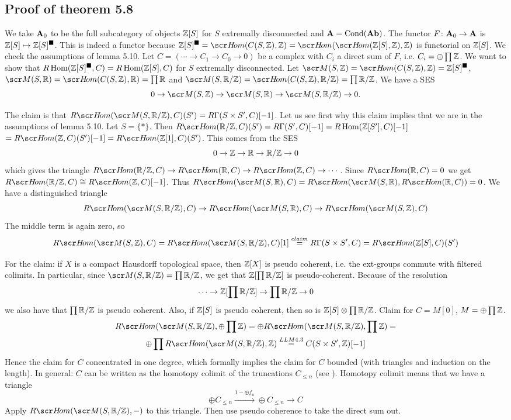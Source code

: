\documentclass[A4paper, british]{amsart}
\theoremstyle{darkgreentheorem}
\theoremstyle{darkbluedefinition}
\theoremstyle{darkredexample}
\theoremstyle{remark}
\DeclareMathOperator{\Hom}{Hom}
\DeclareMathOperator{\Cond}{Cond}
\newcommand{\1}{\mathbbm{1}}
\newcommand{\ot}{\otimes}
\newcommand{\op}{\oplus}
\newcommand{\tms}{\times}
\newcommand{\solid}{^{\blacksquare}}
\begin{document}
\subsection{Proof of theorem 5.8}

We take $\mathbf{A}_{0}$ to be the full subcategory of objects $\mathbb{Z}[S]$ for $S$ extremally disconnected and $\bfA=\Cond(\Ab)$.
The functor $F\colon \mathbf{A}_{0}\to \mathbf{A}$ is $\Z[S]\mapsto \Z[S]\solid$.
This is indeed a functor because $\Z[S]\solid=\hom(C(S,\Z),\Z)=\hom(\hom(\Z[S],\Z),\Z)$ is functorial on $\mathbb{Z}[S]$.
We check the assumptions of lemma 5.10.
Let $C=(\cdots \to C_{1}\to C_{0}\to 0)$ be a complex with $C_{i}$ a direct sum of $F$, i.e. $C_{i}=\op \prod \Z$.
We want to show that $R\Hom(\Z[S]\solid,C)=R\Hom(\Z[S],C)$ for $S$ extremally disconnected.
Let $\M(S,\Z)=\hom(C(S,\Z),\Z)=\Z[S]\solid$, $\M(S,\R)=\hom(C(S,\Z),\R)=\prod \R$ and $\M(S,\R/\Z)=\hom(C(S,\Z),\R/\Z)=\prod \R/\Z$.
We have a SES
\[ 0\to \M(S,\Z)\to \M(S,\R)\to \M(S,\R/\Z)\to 0.\]

The claim is that $R\hom(\M(S,\R/\Z),C)(S')=R\Gamma (S\tms S',C)[-1]$.
Let us see first why this claim implies that we are in the assumptions of lemma 5.10.
Let $S=\{*\}$.
Then $R\hom(\R/\Z,C)(S')=R\Gamma(S',C)[-1]=R\Hom(\Z[S'],C)[-1]$$=R\hom(\Z,C)(S')[-1]=R\hom(\Z[1],C)(S')$.
This comes from the SES
\[ 0\to \mathbb{Z}\to \mathbb{R}\to \mathbb{R}/\mathbb{Z}\to 0 \]
which gives the triangle $R\hom(\R/\Z,C)\to R\hom(\R,C)\to R\hom(\Z,C)\to \cdots$.
Since $R\hom(\R,C)=0$ we get $R\hom(\R/\Z,C)\cong R\hom(\Z,C)[-1]$.
Thus $R\hom(\M(S,\R),C)=R\hom(\M(S,\R),R\hom(\R,C))=0$.
We have a distinguished triangle
\[ R\hom(\M(S,\R/\Z),C)\to R\hom(\M(S,\R),C)\to R\hom(\M(S,\Z),C) \]
The middle term is again zero, so
\[ R\hom(\M(S,\Z),C)=R\hom(\M(S,\R/\Z),C)[1]\overset{claim}{=} R\Gamma(S\tms S',C)=R\hom(\Z[S],C)(S')\]

For the claim: if $X$ is a compact Hausdorff topological space, then $\mathbb{Z}[X]$ is pseudo coherent, i.e. the ext-groups commute with filtered colimits.
In particular, since $\M(S,\R/\Z)=\prod \R/\Z$, we get that $\mathbb{Z}[\prod \mathbb{R}/\mathbb{Z}]$ is pseudo-coherent.
Because of the resolution
\[ \cdots \to \mathbb{Z}[\prod \mathbb{R}/\mathbb{Z}]\to \prod \mathbb{R}/\mathbb{Z}\to 0\]
we also have that $\prod \mathbb{R}/\mathbb{Z}$ is pseudo coherent.
Also, if $\mathbb{Z}[S]$ is pseudo coherent, then so is $\Z[S]\ot \prod \R/\Z$.
Claim for $C=M[0]$, $M=\op \prod \Z$.
\begin{multline*}
    R\hom(\M(S,\R/\Z),\op \prod \Z)=\op R\hom(\M(S,\R/\Z),\prod \Z) =\\
    \op \prod R\hom(\M(S,\R/\Z),\Z) \overset{LLM 4.3}{=} C(S\tms S',\Z)[-1]
\end{multline*}
Hence the claim for $C$ concentrated in one degree, which formally implies the claim for $C$ bounded (with triangles and induction on the length).
In general: $C$ can be written as the homotopy colimit of the truncations $C_{\leqslant n}$ (see \cite[Tag 093W]{sta19}).
Homotopy colimit means that we have a triangle
\[ \op C_{\leqslant n} \xrightarrow{1-\op f_{n}}\op C_{\leqslant n}\to C \]
Apply $R\hom(\M(S,\R/\Z),-)$ to this triangle.
Then use pseudo coherence to take the direct sum out.
\end{document}
